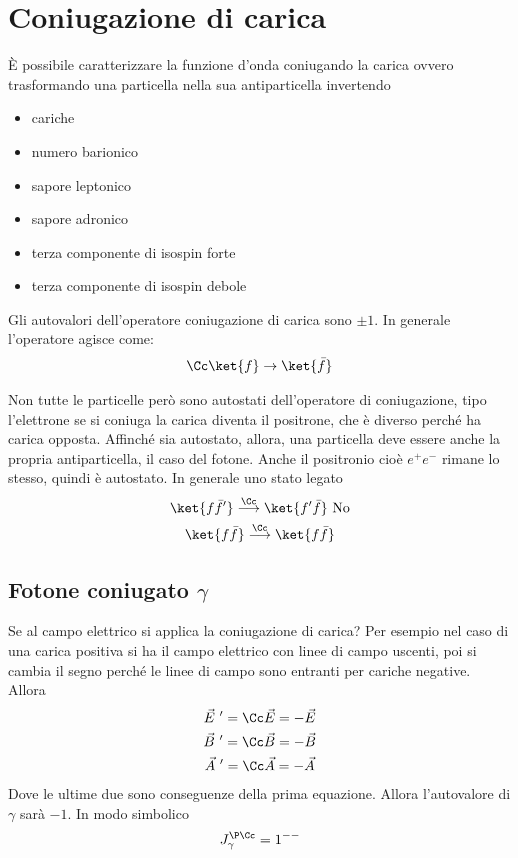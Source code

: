 \documentclass[12pt]{book}
\begin{document}
\section{Coniugazione di carica}
È possibile caratterizzare la funzione d'onda coniugando la carica ovvero trasformando una particella nella sua antiparticella invertendo
\begin{itemize}
	\item cariche
	\item numero barionico
	\item sapore leptonico
	\item sapore adronico
	\item terza componente di isospin forte
	\item terza componente di isospin debole
\end{itemize}
Gli autovalori dell'operatore coniugazione di carica sono $\pm 1$. In generale l'operatore agisce come:
\begin{gather}
	\Cc \ket{f} \rightarrow \ket{\bar f}
\end{gather}


Non tutte le particelle però sono autostati dell'operatore di coniugazione, tipo l'elettrone se si coniuga la carica diventa il positrone, che è diverso perché ha carica opposta.  Affinché sia autostato, allora, una particella deve essere anche la propria antiparticella, il caso del fotone. Anche il positronio cioè $e^+ e^-$ rimane lo stesso, quindi è autostato. In generale uno stato legato 
\begin{gather}
	\ket{f \bar f'} \overset{\Cc}{\longrightarrow} \ket{f' \bar f} \ \text{No}\\
	\ket{f \bar f} \overset{\Cc}{\longrightarrow} \ket{f \bar f}
\end{gather}

\subsection{Fotone coniugato $\gamma$}
Se al campo elettrico si applica la coniugazione di carica? Per esempio nel caso di una carica positiva si ha il campo elettrico con linee di campo uscenti, poi si cambia il segno perché le linee di campo sono entranti per cariche negative. Allora
\begin{gather}
	\vec E \ ' = \Cc \vec E = - \vec E\\
	\vec B \ ' = \Cc \vec B = - \vec B\\
	\vec A \ ' = \Cc \vec A = - \vec A
\end{gather}
Dove le ultime due sono conseguenze della prima equazione. Allora l'autovalore di $\gamma$ sarà $-1$. In modo simbolico
\begin{gather}
	J_\gamma ^{\P \Cc} = 1^{--}
\end{gather}
\end{document}
